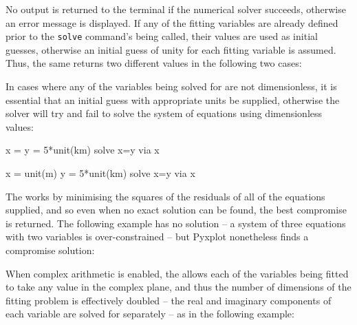 \vspace{3mm}

\vspace{3mm}

\noindent No output is returned to the terminal if the numerical solver
succeeds, otherwise an error message is displayed. If any of the fitting
variables are already defined prior to the {\tt solve} command's being called,
their values are used as initial guesses, otherwise an initial guess of unity
for each fitting variable is assumed. Thus, the same  returns
two different values in the following two cases:

\vspace{3mm}

\vspace{3mm}

\noindent In cases where any of the variables being solved for are not
dimensionless, it is essential that an initial guess with appropriate units be
supplied, otherwise the solver will try and fail to solve the system of
equations using dimensionless values:

\begin{dontdo}
x =\newline
y = 5*unit(km)\newline
solve x=y via x
\end{dontdo}

\begin{dodo}
x = unit(m)\newline
y = 5*unit(km)\newline
solve x=y via x
\end{dodo}

The  works by minimising the squares of the residuals of all of the
equations supplied, and so even when no exact solution can be found, the best
compromise is returned. The following example has no solution -- a system of
three equations with two variables is over-constrained -- but Pyxplot
nonetheless finds a compromise solution:

\vspace{3mm}

\vspace{3mm}

When complex arithmetic is enabled, the  allows each of the
variables being fitted to take any value in the complex plane, and thus the
number of dimensions of the fitting problem is effectively doubled -- the real
and imaginary components of each variable are solved for separately -- as in
the following example:

